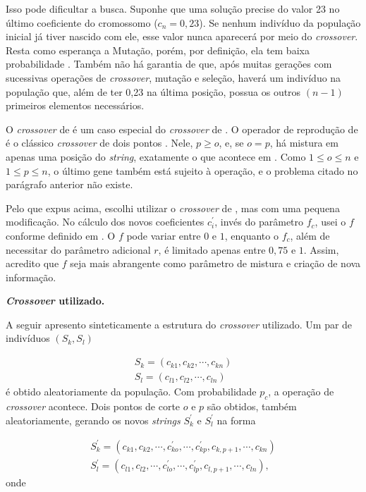 	Isso pode dificultar a busca. Suponhe que uma solução precise do valor 23 no último coeficiente do cromossomo ($c_n = 0,23$). Se nenhum indivíduo da população inicial já tiver nascido com ele, esse valor nunca aparecerá por meio do \emph{crossover}. Resta como esperança a Mutação, porém, por definição, ela tem baixa probabilidade \cite{Linden2008}. Também não há garantia de que, após muitas gerações com sucessivas operações de \emph{crossover}, mutação e seleção, haverá um indivíduo na população que, além de ter 0,23 na última posição, possua os outros $(n-1)$ primeiros elementos necessários.
		
		O \emph{crossover} de \cite{metodo2004} é um caso especial do \emph{crossover} de \cite{metodo2011}. O operador de reprodução de \cite{metodo2011} é o clássico \emph{crossover} de dois pontos \cite{Linden2008}. Nele, $p \geq o$, e, se $o = p$, há mistura em apenas uma posição do \emph{string}, exatamente o que acontece em \cite{metodo2004}. Como $1 \leq o \leq n$ e $1 \leq p \leq n$, o último gene também está sujeito à operação, e o problema citado no parágrafo anterior não existe.
		
	Pelo que expus acima, escolhi utilizar o \emph{crossover} de \cite{metodo2011}, mas com uma pequena modificação. No cálculo dos novos coeficientes $c^{'}_{i}$, invés do parâmetro $f_c$, usei o $f$ conforme definido em \cite{metodo2004}. O $f$ pode variar entre $0$ e $1$, enquanto o $f_c$, além de necessitar do parâmetro adicional $r$, é limitado apenas entre $0,75$ e $1$. Assim, acredito que $f$ seja mais abrangente como parâmetro de mistura e criação de nova informação.
	
	\textbf{\emph{Crossover} utilizado.}
	
	A seguir apresento sinteticamente a estrutura do \emph{crossover} utilizado. Um par de indivíduos $(S_k, S_l)$
	
	\begin{equation}
		\begin{array}{l}
			S_k = (c_{k1}, c_{k2}, \cdots, c_{kn})	\\
			S_l = (c_{l1}, c_{l2}, \cdots, c_{ln})	
		\end{array}
	\end{equation}
	é obtido aleatoriamente da população. Com probabilidade $p_c$, a operação de \emph{crossover} acontece. Dois pontos de corte $o$ e $p$ são obtidos, também aleatoriamente, gerando os novos \emph{strings} $S^{'}_k$ e $S^{'}_l$ na forma
		
	\begin{equation}
		\begin{array}{l}
			S^{'}_k = (c_{k1}, c_{k2}, \cdots, c^{'}_{ko}, \cdots , c^{'}_{kp}, c_{k,p+1}, \cdots, c_{kn})	\\
			S^{'}_l = (c_{l1}, c_{l2}, \cdots, c^{'}_{lo}, \cdots , c^{'}_{lp}, c_{l,p+1}, \cdots, c_{ln}),
		\end{array}
	\end{equation}
	onde
	
